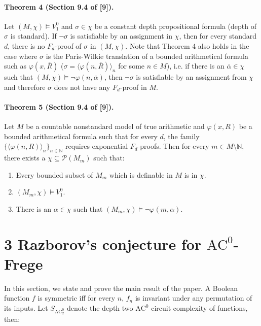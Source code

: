 \documentclass[10pt,a4paper]{article}
\begin{document}
\paragraph{Theorem 4 (Section 9.4 of [9]).} Let $(M,\chi)\models V_1^0$ and $\sigma\in\chi$ be a constant depth propositional formula (depth of $\sigma$ is standard). If $\neg\sigma$ is satisfiable by an assignment in $\chi$, then for every standard $d$, there is no $F_d$-proof of $\sigma$ in $(M,\chi)$.
Note that Theorem 4 also holds in the case where $\sigma$ is the Paris-Wilkie translation of a bounded arithmetical formula such as $\varphi(x,\overline R)$ ($\sigma=\langle\varphi(n,\overline R)\rangle_n$ for some $n\in M$), i.e. if there is an $\overline\alpha\in\chi$ such that $(M,\chi)\models\neg\varphi(n,\overline\alpha)$, then $\neg\sigma$ is satisfiable by an assignment from $\chi$ and therefore $\sigma$ does not have any $F_d$-proof in $M$.
\paragraph{Theorem 5 (Section 9.4 of [9]).} Let $M$ be a countable nonstandard model of true arithmetic and $\varphi(x,R)$ be a bounded arithmetical formula such that for every $d$, the family $\{\langle\varphi(n,R)\rangle_n\}_{n\in\mathbb N}$ requires exponential $F_d$-proofs. Then for every $m\in M\setminus\mathbb N$, there exists a $\chi\subseteq\mathcal P(M_m)$ such that:
\begin{enumerate}
\item Every bounded subset of $M_m$ which is definable in $M$ is in $\chi$.
\item $(M_m,\chi)\models V_1^0$.
\item There is an $\alpha\in\chi$ such that $(M_m,\chi)\models\neg\varphi(m,\alpha)$.
\end{enumerate}
\section*{3 Razborov's conjecture for $\mathrm{AC}^0$-Frege}
In this section, we state and prove the main result of the paper.
A Boolean function $f$ is symmetric iff for every $n$, $f_n$ is invariant under any permutation of its inputs. Let $S_{\mathrm{AC}_2^0}$ denote the depth two $\mathrm{AC}^0$ circuit complexity of functions, then:
\end{document}
